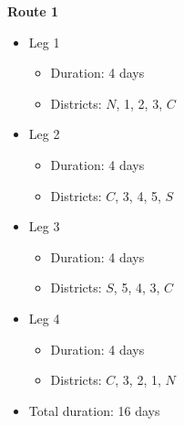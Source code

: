 \documentclass[10pt]{article}
\begin{document}
\begin{minipage}[t]{0.3\textwidth}
    \textbf{Route 1}
    \begin{itemize}
        \item Leg 1
        \begin{itemize}
            \item Duration: 4 days 
            \item Districts: $N $, 1, 2, 3, $C $
        \end{itemize}
        \item Leg 2
        \begin{itemize}
            \item Duration: 4 days 
            \item Districts: $C $, 3, 4, 5, $S $
        \end{itemize}
        \item Leg 3
        \begin{itemize}
            \item Duration: 4 days 
            \item Districts: $S $, 5, 4, 3, $C $
        \end{itemize}
        \item Leg 4
        \begin{itemize}
            \item Duration: 4 days 
            \item Districts: $C $, 3, 2, 1, $N $
        \end{itemize}
        \item Total duration: 16 days
    \end{itemize}
\end{minipage}
\hfill %
\end{document}
